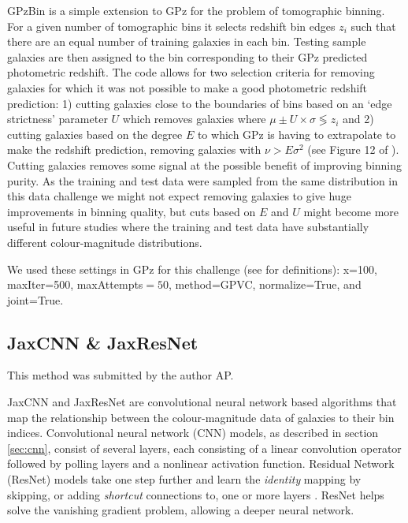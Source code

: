 \documentclass[twocolumn,twocolappendix]{aastex63}
\begin{document}


GPzBin is a simple extension to GPz for the problem of tomographic binning. For
a given number of tomographic bins it selects redshift bin edges $z_{i}$ such
that there are an equal number of training galaxies in each bin. Testing sample
galaxies are then assigned to the bin corresponding to their GPz predicted
photometric redshift. The code allows for two selection criteria for removing
galaxies for which it was not possible to make a good photometric redshift
prediction: 1) cutting galaxies close to the boundaries of bins based on an
`edge strictness' parameter $U$ which removes galaxies where $\mu\pm U \times
\sigma \lessgtr z_i$ and 2) cutting galaxies based on the degree $E$ to which
GPz is having to extrapolate to make the redshift prediction, removing galaxies
with $\nu>E\sigma^2$ (see Figure 12 of \citealp{Hatfield2020}). Cutting galaxies
removes some signal at the possible benefit of improving binning purity. As the
training and test data were sampled from the same distribution in this data
challenge we might not expect removing galaxies to give huge improvements in
binning quality, but cuts based on $E$ and $U$ might become more useful in
future studies where the training and test data have substantially different
colour-magnitude distributions.

We used these settings in GPz for this challenge (see
\citealp{Almosallam2016a,Almosallam2016b} for definitions): x=100, maxIter=500, 
maxAttempts$=50$, method=GPVC, normalize=True, and joint=True.



\subsection{{\sc JaxCNN \& JaxResNet} }
 
This method was submitted by the author AP.
 
JaxCNN and JaxResNet are convolutional neural network based algorithms that
map the relationship between the colour-magnitude data of galaxies to their bin
indices. Convolutional neural network (CNN) models, as described in section
\ref{sec:cnn}, consist of several layers, each consisting of a linear
convolution operator followed by polling layers and a nonlinear activation
function. Residual Network (ResNet) models take one step further and learn the
\textit{identity} mapping by skipping, or adding \textit{shortcut} connections
to, one or more layers \citep{resnet}. ResNet helps solve the vanishing gradient
problem, allowing a deeper neural network.
 
\end{document}
